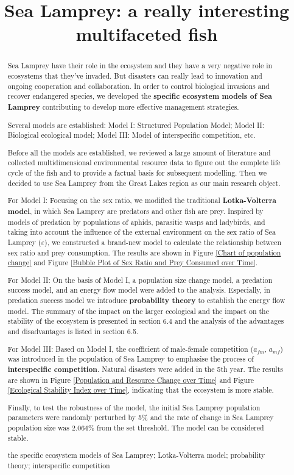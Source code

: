 \documentclass{mcmthesis}
\title{Sea Lamprey: a really interesting multifaceted fish}
\begin{document}
\begin{abstract}
  Sea Lamprey have their role in the ecosystem and they have a very negative role in ecosystems that they've invaded.
  But disasters can really lead to innovation and ongoing cooperation and collaboration.
  In order to control biological invasions and recover endangered species,
  we developed the \textbf{specific ecosystem models of Sea Lamprey} contributing to develop more effective management strategies.

  Several models are established: Model I: Structured Population Model;
  Model II: Biological ecological model;
  Model III: Model of interspecific competition, etc.

  Before all the models are established, we reviewed a large amount of literature and collected multidimensional environmental resource data
  to figure out the complete life cycle of the fish and to provide a factual basis for subsequent modelling.
  Then we decided to use Sea Lamprey from the Great Lakes region as our main research object.

  For Model I: Focusing on the sex ratio, we modified the traditional \textbf{Lotka-Volterra model},
  in which Sea Lamprey are predators and other fish are prey.
  Inspired by models of predation by populations of aphids, parasitic wasps and ladybirds, 
  and taking into account the influence of the external environment on the sex ratio of Sea Lamprey ($\varepsilon$), we constructed a brand-new model 
  to calculate the relationship between sex ratio and prey consumption. 
  The results are shown in Figure \ref{Chart of population change} and Figure \ref{Bubble Plot of Sex Ratio and Prey Consumed over Time}.
  
  For Model II: On the basis of Model I, a population size change model, a predation success model, and an energy flow model were added to the analysis.
  Especially, in predation success model we introduce \textbf{probability theory} to establish the energy flow model.
  The summary of the impact on the larger ecological and the impact on the stability of the ecosystem 
  is presented in section 6.4 and the analysis of the advantages and disadvantages is listed in section 6.5.

  For Model III: Based on Model I, the coefficient of male-female competition ($a_{fm}$, $a_{mf}$) was introduced in the population of Sea Lamprey 
  to emphasise the process of \textbf{interspecific competition}.
  Natural disasters were added in the 5th year. 
  The results are shown in Figure \ref{Population and Resource Change over Time} and Figure \ref{Ecological Stability Index over Time}, indicating that the ecosystem is more stable.
  
  Finally, to test the robustness of the model, the initial Sea Lamprey population parameters were randomly 
  perturbed by 5\% and the rate of change in Sea Lamprey population size was 2.064\% from the set threshold.
  The model can be considered stable.
  
  \begin{keywords}
    the specific ecosystem models of Sea Lamprey; Lotka-Volterra model; probability theory; interspecific competition
  \end{keywords}
\end{abstract}
\end{document}
